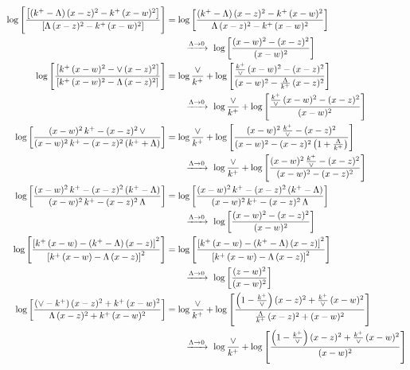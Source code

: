 \documentclass[10pt]{article}
\numberwithin{equation}{section}
\begin{document}
\begin{align}
\log{\left[\frac{\left[(k^{+}-\Lambda)\, (x-z)^{2} - k^{+}\, (x-w)^{2}\right]}{\left[\Lambda\, (x-z)^{2} - k^{+}\, (x-w)^{2}\right]}\right]} &= \log{\left[\frac{(k^{+}-\Lambda)\,(x-z)^{2}-k^{+}\,(x-w)^{2}}{\Lambda\,(x-z)^{2}-k^{+}\,(x-w)^{2}}\right]}\notag\\&\qquad\xrightarrow{\Lambda\to0}\ \log{\left[\frac{(x-w)^{2}-(x-z)^{2}}{(x-w)^{2}}\right]} \notag\\
\log{\left[\frac{\left[k^{+}\,(x-w)^{2}-\vee\, (x-z)^{2}\right]}{\left[k^{+}\,(x-w)^{2}-\Lambda\, (x-z)^{2}\right]}\right]} &= \log\frac{\vee}{k^+} + \log{\left[\frac{\frac{k^{+}}{\vee}\,(x-w)^{2}-(x-z)^{2}}{(x-w)^{2}-\frac{\Lambda}{k^{+}}\,(x-z)^{2}}\right]}\notag\\&\qquad\xrightarrow{\Lambda\to0}\ \log\frac{\vee}{k^+} + \log{\left[\frac{\frac{k^{+}}{\vee}\,(x-w)^{2}-(x-z)^{2}}{(x-w)^{2}}\right]} \notag\\
\log{\left[\frac{(x-w)^{2}\,k^{+}-(x-z)^{2}\,\vee}{(x-w)^{2}\,k^{+} - (x-z)^{2}\,(k^{+}+\Lambda)}\right]} &= \log\frac{\vee}{k^+} + \log{\left[\frac{(x-w)^{2}\,\frac{k^{+}}{\vee}-(x-z)^{2}}{(x-w)^{2}-(x-z)^{2}\left(1+\frac{\Lambda}{k^{+}}\right)}\right]}\notag\\&\qquad\xrightarrow{\Lambda\to0}\ \log\frac{\vee}{k^+} + \log{\left[\frac{(x-w)^{2}\,\frac{k^{+}}{\vee}-(x-z)^{2}}{(x-w)^{2}-(x-z)^{2}}\right]} \notag\\
\log{\left[\frac{(x-w)^{2}\,k^{+}-(x-z)^{2}\,(k^{+}-\Lambda)}{(x-w)^{2}\,k^{+}-(x-z)^{2}\,\Lambda}\right]} &= \log{\left[\frac{(x-w)^{2}\,k^{+}-(x-z)^{2}\,(k^{+}-\Lambda)}{(x-w)^{2}\,k^{+}-(x-z)^{2}\,\Lambda}\right]}\notag\\&\qquad\xrightarrow{\Lambda\to0}\ \log{\left[\frac{(x-w)^{2}-(x-z)^{2}}{(x-w)^{2}}\right]} \notag\\
\log{\left[\frac{\left[k^{+}\,(x-w)-(k^{+}-\Lambda)\,(x-z)\right]^{2}}{\left[k^{+}\,(x-w)-\Lambda\,(x-z)\right]^{2}}\right]} &= \log{\left[\frac{\left[k^{+}\,(x-w)-(k^{+}-\Lambda)\,(x-z)\right]^{2}}{\left[k^{+}\,(x-w)-\Lambda\,(x-z)\right]^{2}}\right]}\notag\\&\qquad\xrightarrow{\Lambda\to0}\ \log{\left[\frac{(z-w)^{2}}{(x-w)^{2}}\right]} \notag\\
\log{\left[\frac{(\vee-k^{+})\,(x-z)^{2}+k^{+}\,(x-w)^{2}}{\Lambda\, (x-z)^{2} + k^{+}\,(x-w)^{2}}\right]} &= \log\frac{\vee}{k^+} + \log{\left[\frac{\left(1-\frac{k^{+}}{\vee}\right)(x-z)^{2}+\frac{k^{+}}{\vee}\,(x-w)^{2}}{\frac{\Lambda}{k^{+}}\,(x-z)^{2}+(x-w)^{2}}\right]}\notag\\&\qquad\xrightarrow{\Lambda\to0}\ \log\frac{\vee}{k^+} + \log{\left[\frac{\left(1-\frac{k^{+}}{\vee}\right)(x-z)^{2}+\frac{k^{+}}{\vee}\,(x-w)^{2}}{(x-w)^{2}}\right]} \notag\\

\end{align}
\end{document}
